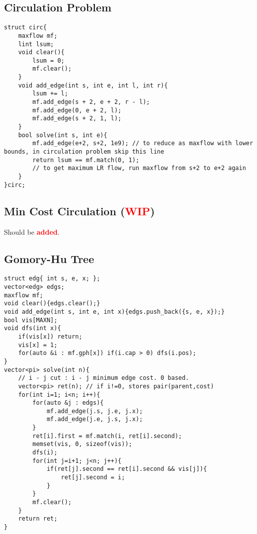 \documentclass[landscape, 8pt, a4paper, oneside,  twocolumn]{extarticle}
\newcommand{\added}{Should be \textcolor{red}{\textbf{added}}.}
\newcommand{\WIP}{\textcolor{red}{\textbf{WIP}}}
\begin{document}
\subsection {Circulation Problem}
\begin{verbatim}
struct circ{
	maxflow mf;
	lint lsum;
	void clear(){
		lsum = 0;
		mf.clear();
	}
	void add_edge(int s, int e, int l, int r){
		lsum += l;
		mf.add_edge(s + 2, e + 2, r - l);
		mf.add_edge(0, e + 2, l);
		mf.add_edge(s + 2, 1, l);
	}
	bool solve(int s, int e){
		mf.add_edge(e+2, s+2, 1e9); // to reduce as maxflow with lower bounds, in circulation problem skip this line
		return lsum == mf.match(0, 1);
		// to get maximum LR flow, run maxflow from s+2 to e+2 again
	}
}circ;
\end{verbatim}

\subsection {Min Cost Circulation (\WIP)}
\added

\subsection {Gomory-Hu Tree}
\begin{verbatim}
struct edg{ int s, e, x; };
vector<edg> edgs;
maxflow mf;
void clear(){edgs.clear();}
void add_edge(int s, int e, int x){edgs.push_back({s, e, x});}
bool vis[MAXN];
void dfs(int x){
	if(vis[x]) return;
	vis[x] = 1;
	for(auto &i : mf.gph[x]) if(i.cap > 0) dfs(i.pos);
}
vector<pi> solve(int n){
	// i - j cut : i - j minimum edge cost. 0 based. 
	vector<pi> ret(n); // if i!=0, stores pair(parent,cost)
	for(int i=1; i<n; i++){
		for(auto &j : edgs){
			mf.add_edge(j.s, j.e, j.x);
			mf.add_edge(j.e, j.s, j.x);
		}
		ret[i].first = mf.match(i, ret[i].second);
		memset(vis, 0, sizeof(vis));
		dfs(i);
		for(int j=i+1; j<n; j++){
			if(ret[j].second == ret[i].second && vis[j]){
				ret[j].second = i;
			}
		}
		mf.clear();
	}
	return ret;
}
\end{verbatim}
\end{document}
